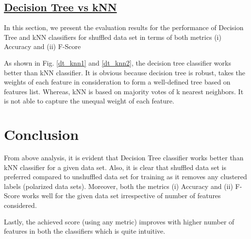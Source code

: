 \documentclass[journal,onecolumn]{IEEEtran}
\begin{document}
\subsection{\underline{Decision Tree vs kNN }}
In this section, we present the evaluation results for the performance of Decision Tree and kNN classifiers for shuffled data set in terms of both metrics (i) Accuracy and (ii) F-Score



As shown in Fig. \ref{dt_knn1} and \ref{dt_knn2}, the decision tree classifier works better than kNN classifier. It is obvious because decision tree is robust, takes the weights of each feature in consideration to form a well-defined tree based on features list. Whereas, kNN is based on majority votes of k nearest neighbors. It is not able to capture the unequal weight of each feature.

\section{Conclusion}
From above analysis, it is evident that Decision Tree classifier works better than kNN classifier for a given data set. Also, it is clear that shuffled data set is preferred compared to unshuffled data set for training as it removes any clustered labels (polarized data sets). Moreover, both the metrics (i) Accuracy and (ii) F-Score works well for the given data set irrespective of number of features considered.

Lastly, the achieved score (using any metric) improves with higher number of features in both the classifiers which is quite intuitive.
\end{document}
